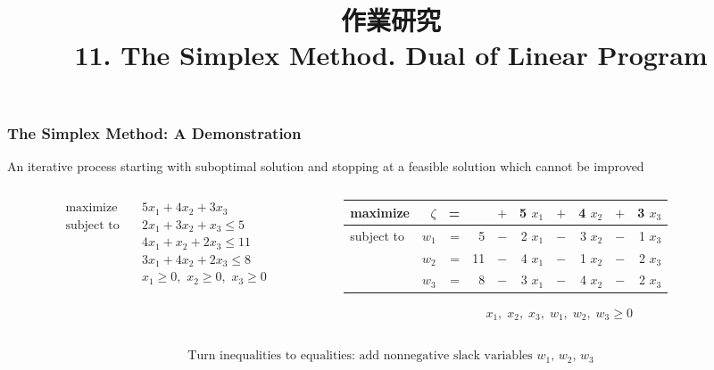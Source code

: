 \documentclass[usenames,dvipsnames,8pt]{beamer}%
\title{作業研究\\ 11. The Simplex Method. Dual of Linear Program}
\author{}%
\date{}
\begin{document}
\begin{frame}
  \titlepage
\end{frame}

\begin{frame}
  \frametitle{The Simplex Method: A Demonstration}
  \begin{center}
    {\color{C2}An iterative process starting with suboptimal solution and stopping at a feasible solution which cannot be improved} 
  \end{center}
  \begin{columns}
    \begin{column}{0.5\textwidth}
      \begin{align*}
        \text{maximize}\quad    &5 x_1 + 4 x_2 + 3 x_3 \\
        \text{subject to}\quad  &2 x_1 + 3 x_2 + x_3 \leqslant 5 \\
                                &4 x_1 + x_2 + 2 x_3 \leqslant 11 \\
                                &3 x_1 + 4 x_2 + 2 x_3 \leqslant 8 \\
                                &x_1\geqslant 0,\,\,x_2\geqslant 0,\,\,x_3\geqslant 0
      \end{align*}
    \end{column}
    \begin{column}{0.5\textwidth}
      \begin{table}[ht]
        \centering
        \setlength\tabcolsep{2pt}
        \begin{tabular}{lrrrcrcrcr}
          \toprule
          maximize   &$\zeta$& = &   & $+$ & 5 $x_1$ & $+$ & 4 $x_2$ & $+$ & 3 $x_3$ \\
          \midrule
          subject to & $w_1$ & = & 5 & $-$ & 2 $x_1$ & $-$ & 3 $x_2$ & $-$ & 1 $x_3$ \\
                     & $w_2$ & = &11 & $-$ & 4 $x_1$ & $-$ & 1 $x_2$ & $-$ & 2 $x_3$ \\
                     & $w_3$ & = & 8 & $-$ & 3 $x_1$ & $-$ & 4 $x_2$ & $-$ & 2 $x_3$ \\ 
          \bottomrule
        \end{tabular}
      \end{table}
      \vspace{-0.4cm}
      \begin{align*}
        x_1,\;x_2,\;x_3,\;w_1,\;w_2,\;w_3\geqslant 0
      \end{align*}
    \end{column}
  \end{columns}
  \vspace{0.5cm}
  \begin{align*}
    \text{Turn inequalities to equalities: add nonnegative slack variables $w_1$, $w_2$, $w_3$} \\
  \end{align*}
\end{frame}
\end{document}
